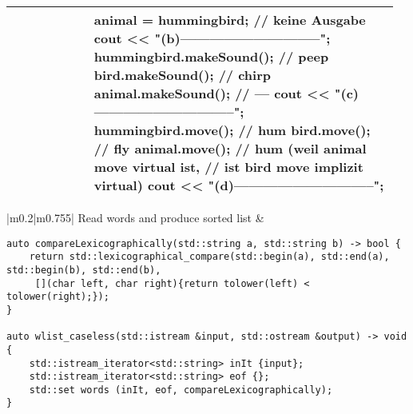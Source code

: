 \documentclass[main.tex,fontsize=8pt,paper=a4,paper=portrait,DIV=calc,]{scrartcl}
\begin{document}
\begin{table}[ht!]
\begin{tabular}{|m{0.2\linewidth}|m{0.755\linewidth}|}
\begin{lstlisting}
struct Bird : Animal {
    virtual auto makeSound() -> void { cout << "chirp\n"; }
    auto move() -> void { cout << "fly\n"; }

    Bird() { cout << "bird hatched\n"; }
    ~Bird() { cout << "bird crashed\n"; }
};

struct Hummingbird : Bird {
    auto makeSound() -> void { cout << "peep\n"; }
    virtual auto move() -> void { cout << "hum\n"; }

    Hummingbird() { cout << "hummingbird hatched\n"; }
    ~Hummingbird() { cout << "hummingbird died\n"; }
};

auto main() -> int {
    cout << "(a)----------------------------\n";
    Hummingbird hummingbird;        // animal born
    Bird bird = hummingbird;        // keine Ausgabe
    Animal &animal = hummingbird;   // keine Ausgabe
    cout << "(b)-----------------------------\n";
    hummingbird.makeSound();        // peep
    bird.makeSound();               // chirp
    animal.makeSound();             // ---
    cout << "(c)-----------------------------\n";
    hummingbird.move();             // hum
    bird.move();                    // fly
    animal.move();                  // hum (weil animal move virtual ist, 
                                    // ist bird move implizit virtual)
    cout << "(d)-----------------------------\n";
}
\end{lstlisting}
\\
\hline
\end{tabular}
\end{table}
\pagebreak
\begin{table}[ht!]
\begin{tabular}{|m{0.2\linewidth}|m{0.755\linewidth}|}
\hline
Read words and produce sorted list & 
\begin{lstlisting}
auto compareLexicographically(std::string a, std::string b) -> bool {
    return std::lexicographical_compare(std::begin(a), std::end(a), std::begin(b), std::end(b),
     [](char left, char right){return tolower(left) < tolower(right);});
}

auto wlist_caseless(std::istream &input, std::ostream &output) -> void {
    std::istream_iterator<std::string> inIt {input};
    std::istream_iterator<std::string> eof {};
    std::set words (inIt, eof, compareLexicographically);
}
\end{lstlisting}
\\
\hline
\end{tabular}
\end{table}
\pagebreak
\end{document}
